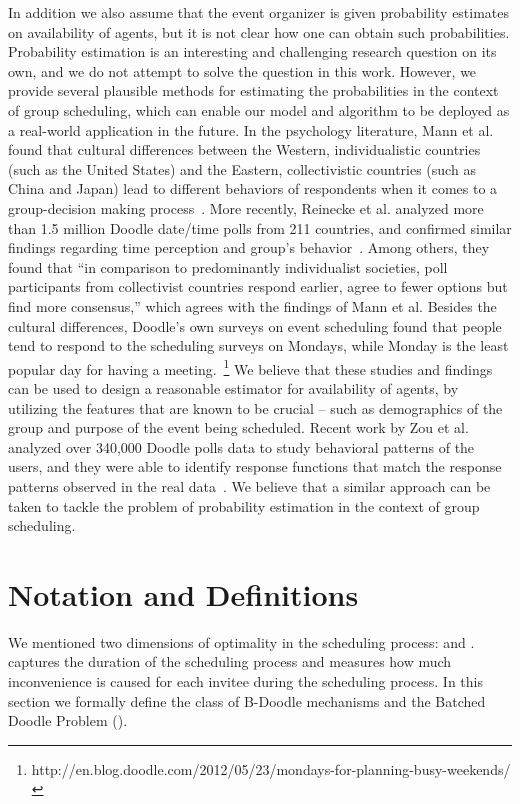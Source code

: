 In addition we also  assume that the event organizer is given probability estimates on availability of agents, but it is not clear how one can obtain such probabilities. 
 Probability estimation is an interesting and challenging research question on its own, and we do not attempt to solve the question in this work. However, we provide several plausible methods for estimating the probabilities in the context of group scheduling, which can enable our model and algorithm to be deployed as a real-world application in the future.
 In the psychology literature, Mann et al. found that cultural differences between the Western, individualistic countries (such as the United States) and the Eastern, collectivistic countries (such as China and Japan) lead to different behaviors of respondents when it comes to a group-decision making process~\cite{mann1998cross}.
 More recently, Reinecke et al. analyzed more than 1.5 million Doodle date/time polls from 211 countries, and confirmed similar findings regarding time perception and group's behavior~\cite{reinecke2013doodle}. Among others, they found that ``in comparison to predominantly individualist societies, poll participants from collectivist countries respond earlier, agree to fewer options but find more consensus,'' which agrees with the findings of Mann et al.
 Besides the cultural differences, Doodle's own surveys on event scheduling found that people tend to respond to the scheduling surveys on Mondays, while Monday is the least popular day for having a meeting.~\footnote{http://en.blog.doodle.com/2012/05/23/mondays-for-planning-busy-weekends/}
 We believe that these studies and findings can be used to design a reasonable estimator for availability of agents, by utilizing the features that are known to be crucial -- such as demographics of the group and purpose of the event being scheduled.
 Recent work by Zou et al. analyzed over 340,000 Doodle polls data to study behavioral patterns of the users, and they were able to identify response functions that match the response patterns observed in the real data~\cite{zou2015strategic}. We believe that a similar approach can be taken to tackle the problem of probability estimation in the context of group scheduling.


\section{Notation and Definitions}
We mentioned two dimensions of optimality in the scheduling process: \Times and \Inconvenience.
\Times captures the duration of the scheduling process and \Inconveniences measures how much inconvenience is caused for each invitee during the scheduling process.
In this section we formally define the class of B-Doodle mechanisms and the Batched Doodle Problem (\BDP).

